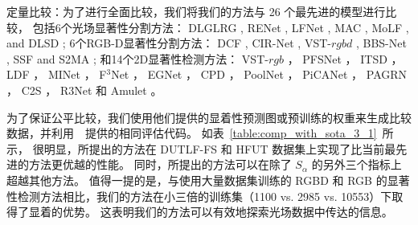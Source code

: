 定量比较：为了进行全面比较，我们将我们的方法与 26 个最先进的模型进行比较，
包括6个光场显著性分割方法：
DLGLRG \cite{liu2021light}, RENet \cite{piao2020exploit}, LFNet \cite{zhang2020lfnet},
MAC \cite{zhang2020light}, MoLF \cite{zhang2019memory}, and DLSD \cite{piao2019deep};
%
%
%
%
6个RGB-D显著性分割方法：
DCF \cite{ji2021calibrated}, CIR-Net \cite{cong2022cir}, VST-$rgbd$  \cite{liu2021visual},
BBS-Net     \cite{fan2020bbs}, SSF     \cite{zhang2020select} and S2MA    \cite{liu2020learning};
%
%
%
%
%
和14个2D显著性检测方法：
VST-$rgb$ \cite{liu2021visual}，
PFSNet \cite{ma2021pyramidal}，
ITSD \cite{zhou2020interactive}，
LDF \cite{wei2020label}，
MINet \cite{pang2020multi}，
F$^{3}$Net  \cite{wei2020f3net}， 
EGNet   \cite{zhao2019egnet}，
CPD  \cite{wu2019cascaded}，
PoolNet \cite{liu2019simple}，
PiCANet \cite{liu2018picanet}，
PAGRN \cite{wang2018detect}，
C2S   \cite{li2018contour}，
R3Net  \cite{deng2018r3net}
和
Amulet \cite{zhang2017amulet}
。
%
%
%
%
%
\par
%
%
为了保证公平比较，我们使用他们提供的显着性预测图或预训练的权重来生成比较数据，并利用~\cite{liu2021visual}~提供的相同评估代码。 
如表~\ref{table:comp_with_sota_3_1}~所示，
很明显，所提出的方法在 DUTLF-FS 和 HFUT 数据集上实现了比当前最先进的方法更优越的性能。 同时，所提出的方法可以在除了 $ S_{\alpha} $ 的另外三个指标上超越其他方法。 值得一提的是，与使用大量数据集训练的 RGBD 和 RGB 的显著性检测方法相比，我们的方法在小三倍的训练集（1100 vs. 2985 vs. 10553）下取得了显着的优势。 这表明我们的方法可以有效地探索光场数据中传达的信息。 
%
%
%
%
%
%
